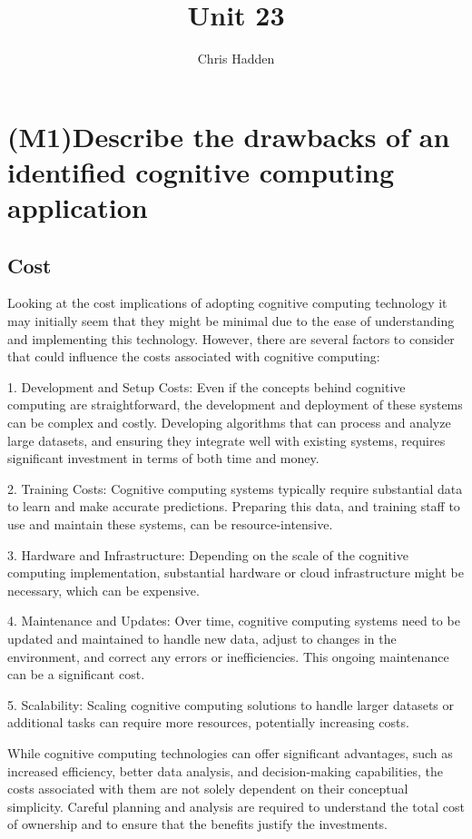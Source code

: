 \documentclass{article}
\title{Unit 23}
\author{Chris Hadden}
\date{}
\begin{document}
\maketitle

\section{(M1)Describe the drawbacks of an identified cognitive computing application}

\subsection{Cost}
Looking at the cost implications of adopting cognitive computing technology it may initially seem that they might be minimal due to the ease of understanding and implementing this technology. However, there are several factors to consider that could influence the costs associated with cognitive computing:

1. Development and Setup Costs: Even if the concepts behind cognitive computing are straightforward, the development and deployment of these systems can be complex and costly. Developing algorithms that can process and analyze large datasets, and ensuring they integrate well with existing systems, requires significant investment in terms of both time and money.

2. Training Costs: Cognitive computing systems typically require substantial data to learn and make accurate predictions. Preparing this data, and training staff to use and maintain these systems, can be resource-intensive.

3. Hardware and Infrastructure: Depending on the scale of the cognitive computing implementation, substantial hardware or cloud infrastructure might be necessary, which can be expensive.

4. Maintenance and Updates: Over time, cognitive computing systems need to be updated and maintained to handle new data, adjust to changes in the environment, and correct any errors or inefficiencies. This ongoing maintenance can be a significant cost.

5. Scalability: Scaling cognitive computing solutions to handle larger datasets or additional tasks can require more resources, potentially increasing costs.

While cognitive computing technologies can offer significant advantages, such as increased efficiency, better data analysis, and decision-making capabilities, the costs associated with them are not solely dependent on their conceptual simplicity. Careful planning and analysis are required to understand the total cost of ownership and to ensure that the benefits justify the investments.
\end{document}
